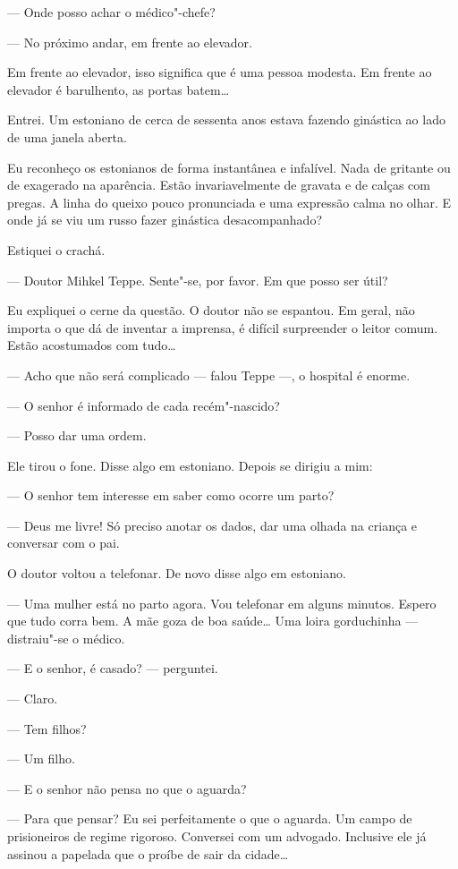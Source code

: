 --- Onde posso achar o médico"-chefe?

--- No próximo andar, em frente ao elevador.

Em frente ao elevador, isso significa que é uma pessoa modesta. Em
frente ao elevador é barulhento, as portas batem\ldots{}

Entrei. Um estoniano de cerca de sessenta anos estava fazendo ginástica
ao lado de uma janela aberta.

Eu reconheço os estonianos de forma instantânea e infalível. Nada de
gritante ou de exagerado na aparência. Estão invariavelmente de gravata
e de calças com pregas. A linha do queixo pouco pronunciada e uma
expressão calma no olhar. E onde já se viu um russo fazer ginástica
desacompanhado?

Estiquei o crachá.

--- Doutor Mihkel Teppe. Sente"-se, por favor. Em que posso ser útil?

Eu expliquei o cerne da questão. O doutor não se espantou. Em geral, não
importa o que dá de inventar a imprensa, é difícil surpreender o leitor
comum. Estão acostumados com tudo\ldots{}

--- Acho que não será complicado --- falou Teppe ---, o hospital é
enorme.

--- O senhor é informado de cada recém"-nascido?

--- Posso dar uma ordem.

Ele tirou o fone. Disse algo em estoniano. Depois se dirigiu a mim:

--- O senhor tem interesse em saber como ocorre um parto?

--- Deus me livre! Só preciso anotar os dados, dar uma olhada na criança
e conversar com o pai.

O doutor voltou a telefonar. De novo disse algo em estoniano.

--- Uma mulher está no parto agora. Vou telefonar em alguns minutos.
Espero que tudo corra bem. A mãe goza de boa saúde\ldots{} Uma loira
gorduchinha --- distraiu"-se o médico.

--- E o senhor, é casado? --- perguntei.

--- Claro.

--- Tem filhos?

--- Um filho.

--- E o senhor não pensa no que o aguarda?

--- Para que pensar? Eu sei perfeitamente o que o aguarda. Um campo de
prisioneiros de regime rigoroso. Conversei com um advogado. Inclusive
ele já assinou a papelada que o proíbe de sair da cidade\ldots{}

